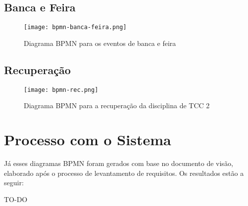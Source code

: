 \subsection{Banca e Feira}
\begin{figure}[H]
    \centering
    \texttt{[image: bpmn-banca-feira.png]}
    \caption{Diagrama BPMN para os eventos de banca e feira}
    \label{fig:bpmn-banca-feira}
\end{figure}

\subsection{Recuperação}
\begin{figure}[H]
    \centering
    \texttt{[image: bpmn-rec.png]}
    \caption{Diagrama BPMN para a recuperação da disciplina de TCC 2}
    \label{fig:bpmn-rec}
\end{figure}

\section{Processo com o Sistema}

Já esses diagramas BPMN foram gerados com base no documento de visão, elaborado após o processo de levantamento de requisitos. Os resultados estão a seguir:

TO-DO

